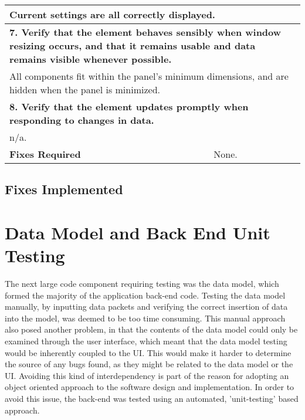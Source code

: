 \begin{longtable}{ l p{10cm} }
 \multicolumn{2}{p{14cm}}{Current settings are all correctly displayed.}\\
 \hline
 \multicolumn{2}{p{14cm}}{\textbf{7. Verify that the element behaves sensibly when window resizing occurs, and that it remains usable and data remains visible whenever possible.}}\\
 \multicolumn{2}{p{14cm}}{All components fit within the panel's minimum dimensions, and are hidden when the panel is minimized.}\\
 \hline
 \multicolumn{2}{p{14cm}}{\textbf{8. Verify that the element updates promptly when responding to changes in data.}}\\
 \multicolumn{2}{p{14cm}}{n/a.}\\
 \hline
 \textbf{Fixes Required} & None.\\
 \bottomrule
\end{longtable}
\clearpage

\subsection{Fixes Implemented}


\section{Data Model and Back End Unit Testing} \label{BackEndUnitTesting}
The next large code component requiring testing was the data model, which formed the majority of the application back-end code. Testing the data model manually, by inputting data packets and verifying the correct insertion of data into the model, was deemed to be too time consuming. This manual approach also posed another problem, in that the contents of the data model could only be examined through the user interface, which meant that the data model testing would be inherently coupled to the UI. This would make it harder to determine the source of any bugs found, as they might be related to the data model or the UI. Avoiding this kind of interdependency is part of the reason for adopting an object oriented approach to the software design and implementation. In order to avoid this issue, the back-end was tested using an automated, 'unit-testing' based approach.

